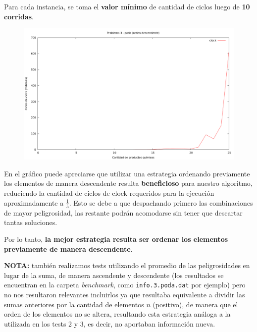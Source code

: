 Para cada instancia, se toma el \textbf{valor mínimo} de cantidad de ciclos luego de \textbf{10 corridas}.

\vspace*{0.5cm}

\begin{figure}[h]
  \begin{center}
    \includegraphics[scale=0.35]{imagenes/grafico-3-poda.png}
  \end{center}
\end{figure}

\vspace*{0.5cm}

En el gráfico puede apreciarse que utilizar una estrategia ordenando previamente los elementos de
manera descendente resulta \textbf{beneficioso} para nuestro algoritmo, reduciendo la cantidad de ciclos
de clock requeridos para la ejecución aproximadamente a $\frac{1}{5}$. Esto se debe a que despachando primero las
combinaciones de mayor peligrosidad, las restante podrán acomodarse sin tener que descartar tantas soluciones.

Por lo tanto, \textbf{la mejor estrategia resulta ser ordenar los elementos previamente de manera descendente}.

\vspace*{0.5cm}

\textbf{NOTA:} también realizamos tests utilizando el promedio de las peligrosidades en lugar de la suma,
de manera ascendente y descendente (los resultados se encuentran en la carpeta \textit{benchmark}, como
\verb|info.3.poda.dat| por ejemplo) pero no nos resultaron relevantes incluirlos ya que resultaba equivalente
a dividir las sumas anteriores por la cantidad de elementos $n$ (positivo), de manera que el orden de
los elementos no se altera, resultando esta estrategia análoga a la utilizada en los tests 2 y 3, es decir,
no aportaban información nueva.
